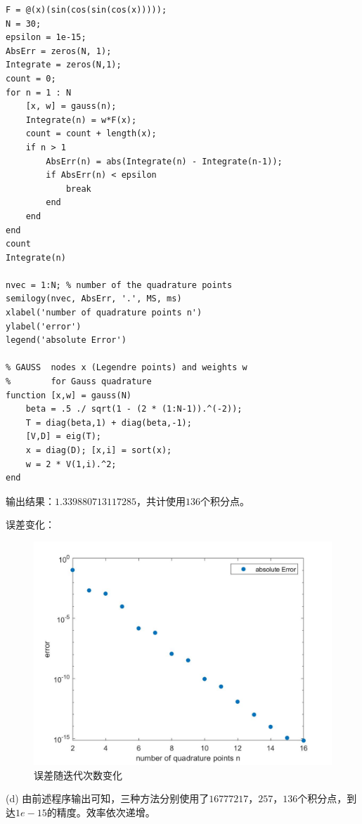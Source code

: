 \documentclass[12pt,a4paper,utf8]{ctexart}
\begin{document}
\begin{enumerate}
\begin{lstlisting}[frame=single]
F = @(x)(sin(cos(sin(cos(x)))));
N = 30;
epsilon = 1e-15;
AbsErr = zeros(N, 1);
Integrate = zeros(N,1);
count = 0;
for n = 1 : N
    [x, w] = gauss(n);
    Integrate(n) = w*F(x);
    count = count + length(x);
    if n > 1
        AbsErr(n) = abs(Integrate(n) - Integrate(n-1));
        if AbsErr(n) < epsilon
            break
        end
    end
end
count
Integrate(n)

nvec = 1:N; % number of the quadrature points
semilogy(nvec, AbsErr, '.', MS, ms)
xlabel('number of quadrature points n')
ylabel('error')
legend('absolute Error')

% GAUSS  nodes x (Legendre points) and weights w
%        for Gauss quadrature
function [x,w] = gauss(N)
    beta = .5 ./ sqrt(1 - (2 * (1:N-1)).^(-2));
    T = diag(beta,1) + diag(beta,-1);
    [V,D] = eig(T);
    x = diag(D); [x,i] = sort(x);
    w = 2 * V(1,i).^2;
end
\end{lstlisting}

输出结果：$1.339880713117285$，共计使用$136$个积分点。

误差变化：

\begin{figure}[H]
    \centering
    \includegraphics[width = .8\textwidth]{1c.jpg}
    \caption{误差随迭代次数变化}
\end{figure}

\subitem(d)
由前述程序输出可知，三种方法分别使用了$16777217$，$257$，$136$个积分点，到达$1e-15$的精度。效率依次递增。


\end{enumerate}
\end{document}
